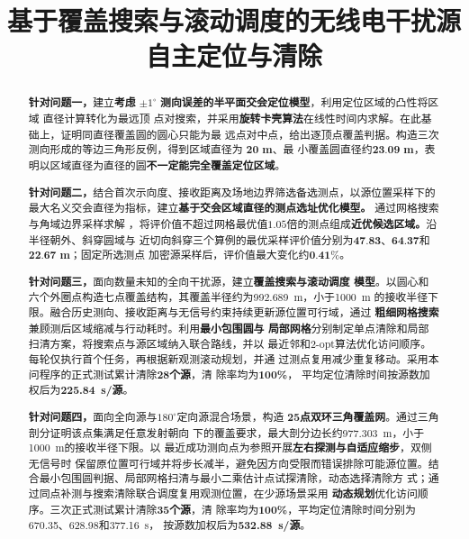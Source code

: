 \documentclass[withoutpreface,bwprint]{cumcmthesis} %
\title{基于覆盖搜索与滚动调度的无线电干扰源自主定位与清除}
\begin{document}
\maketitle
\begin{abstract}

\textbf{针对问题一，}建立\textbf{考虑} $\pm 1^\circ$ \textbf{测向误差的半平面交会定位模型}，利用定位区域的凸性将区域
直径计算转化为最远顶
点对搜索，并采用\textbf{旋转卡壳算法}在线性时间内求解。在此基础上，证明同直径覆盖圆的圆心只能为最
远点对中点，给出逐顶点覆盖判据。构造三次测向形成的等边三角形反例，得到区域直径为 $\textbf{20}$ \textbf{m}、最
小覆盖圆直径约$\textbf{23.09}$ \textbf{m}，表明以区域直径为直径的圆\textbf{不一定能完全覆盖定位区域}。

\textbf{针对问题二，}结合首次示向度、接收距离及场地边界筛选备选测点，以源位置采样下的
最大名义交会直径为指标，建立\textbf{基于交会区域直径的测点选址优化模型。}
通过网格搜索与角域边界采样求解
，将评价值不超过网格最优值$1.05$倍的测点组成\textbf{近优候选区域。}沿半径朝外、斜穿圆域与
近切向斜穿三个算例的最优采样评价值分别为$\textbf{47.83}$、$\textbf{64.37}$和$\textbf{22.67}$ \textbf{m}；固定所选测点
加密源采样后，评价值最大变化约$\textbf{0.41\%}$。

\textbf{针对问题三，}面向数量未知的全向干扰源，建立\textbf{覆盖搜索与滚动调度
模型}。以圆心和六个外圈点构造七点覆盖结构，其覆盖半径约为992.689~m，小于1000~m
的接收半径下限。融合历史测向、接收距离与无信号约束持续更新源位置可行域，通过
\textbf{粗细网格搜索}兼顾测后区域缩减与行动耗时。利用\textbf{最小包围圆与
局部网格}分别制定单点清除和局部扫清方案，将搜索点与源区域纳入联合路线，并以
最近邻和2-opt算法优化访问顺序。每轮仅执行首个任务，再根据新观测滚动规划，并通
过测点复用减少重复移动。采用本问程序的正式测试累计清除\textbf{28个源}，清
除率均为\textbf{100\%}，
平均定位清除时间按源数加权后为\textbf{225.84~s/源}。

\textbf{针对问题四，}面向全向源与$180^\circ$定向源混合场景，构造
\textbf{25点双环三角覆盖网}。通过三角剖分证明该点集满足任意发射朝向
下的覆盖要求，最大剖分边长约977.303~m，小于1000~m的接收半径下限。以
最近成功测向点为参照开展\textbf{左右探测与自适应缩步}，双侧无信号时
保留原位置可行域并将步长减半，避免因方向受限而错误排除可能源位置。结
合最小包围圆判据、局部网格扫清与最小二乘估计点试探清除，动态选择清除方
式；通过同点补测与搜索清除联合调度复用观测位置，在少源场景采用
\textbf{动态规划}优化访问顺序。三次正式测试累计清除\textbf{35个源}，清
除率均为\textbf{100\%}，平均定位清除时间分别为670.35、628.98和377.16~s，
按源数加权后为\textbf{532.88~s/源}。

\end{abstract}
\end{document}
